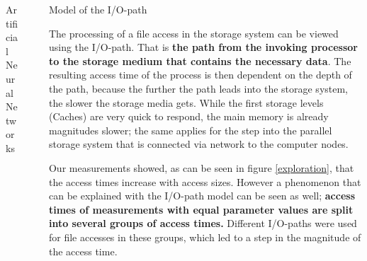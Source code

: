 \documentclass[final]{beamer}
\newlength{\sepwid}
\newlength{\onecolwid}
\begin{document}
\begin{frame}[t]
\begin{columns}[t]
\begin{column}{\onecolwid}
\begin{block}{Artificial Neural Networks}
	
\end{block}

\end{column} %

\begin{column}{\sepwid}\end{column} %

\begin{column}{\onecolwid} %
	

\begin{block}{Model of the I/O-path}
	
	The processing of a file access in the storage system can be viewed using the I/O-path.
	That is \textbf{the path from the invoking processor to the storage medium that contains the necessary data}.
	The resulting access time of the process is then dependent on the depth of the path, because the further the path leads into the storage system, the slower the storage media gets.
	While the first storage levels (Caches) are very quick to respond, the main memory is already magnitudes slower; the same applies for the step into the parallel storage system that is connected via network to the computer nodes.\medskip
	
	Our measurements showed, as can be seen in figure \ref{exploration}, that the access times increase with access sizes.
	However a phenomenon that can be explained with the I/O-path model can be seen as well; \textbf{access times of measurements with equal parameter values are split into several groups of access times.} Different I/O-paths were used for file accesses in these groups, which led to a step in the magnitude of the access time. 
	

\end{block}
\end{column}
\end{columns}
\end{frame}
\end{document}
